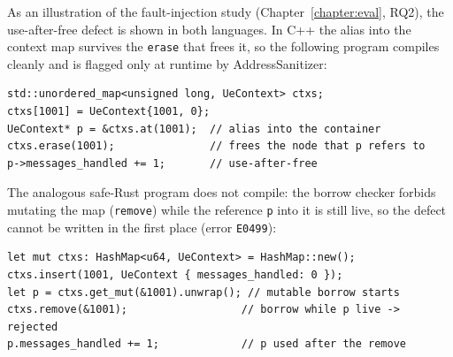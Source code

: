 \documentclass[english,twoside,openright,a4paper,censored,csm,software-track-2020]{HYthesisML}
\begin{document}
\backmatter
\begin{appendices}

As an illustration of the fault-injection study (Chapter~\ref{chapter:eval}, RQ2), the
use-after-free defect is shown in both languages. In C++ the alias into the context map
survives the \texttt{erase} that frees it, so the following program compiles cleanly and is
flagged only at runtime by AddressSanitizer:

\begin{verbatim}
std::unordered_map<unsigned long, UeContext> ctxs;
ctxs[1001] = UeContext{1001, 0};
UeContext* p = &ctxs.at(1001);  // alias into the container
ctxs.erase(1001);               // frees the node that p refers to
p->messages_handled += 1;       // use-after-free
\end{verbatim}

The analogous safe-Rust program does not compile: the borrow checker forbids mutating the map
(\texttt{remove}) while the reference \texttt{p} into it is still live, so the defect cannot be
written in the first place (error \texttt{E0499}):

\begin{verbatim}
let mut ctxs: HashMap<u64, UeContext> = HashMap::new();
ctxs.insert(1001, UeContext { messages_handled: 0 });
let p = ctxs.get_mut(&1001).unwrap(); // mutable borrow starts
ctxs.remove(&1001);                  // borrow while p live -> rejected
p.messages_handled += 1;             // p used after the remove
\end{verbatim}

\end{appendices}

\clearpage
\end{document}
